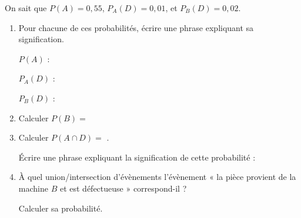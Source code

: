 \documentclass[
	classe=$1^eSTI2D$,
	headerTitle={Probabilités},
	landscape,twocolumn,noheader
]{exercice}
\begin{document}
On sait que $P(A) = 0,55$, $P_A(D) = 0,01$, et $P_B(D) = 0,02$.
\begin{enumerate}
	\item Pour chacune de ces probabilités, écrire une phrase expliquant sa signification.

	      $P(A)$ : 

	      $P_A(D)$ : 

	      $P_B(D)$ : 
	\item Calculer $P(B) = $ 
	\item Calculer $P(A ∩ D) = $ .

	      Écrire une phrase expliquant la signification de cette probabilité :

	\item À quel union/intersection d'évènements l'évènement « la pièce provient de la machine $B$ et est défectueuse » correspond-il ?


	      Calculer sa probabilité. 
\end{enumerate}
\end{document}
